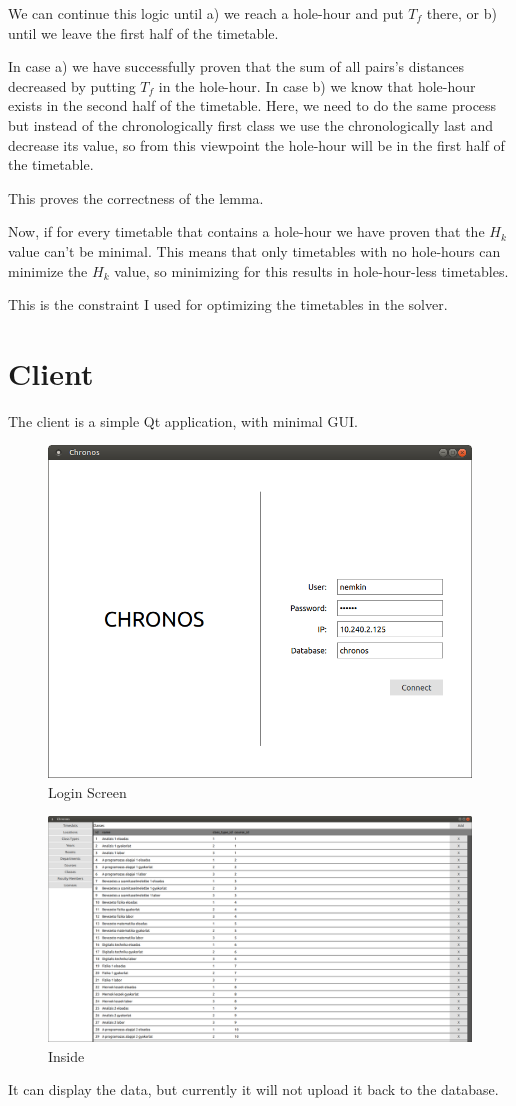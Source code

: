 We can continue this logic until a) we reach a hole-hour and put $T_f$ there, or b) until we leave the first half of the timetable.

In case a) we have successfully proven that the sum of all pairs's distances decreased by putting $T_f$ in the hole-hour. In case b) we know that hole-hour exists in the second half of the timetable. Here, we need to do the same process but instead of the chronologically first class we use the chronologically last and decrease its value, so from this viewpoint the hole-hour will be in the first half of the timetable.

This proves the correctness of the lemma.

Now, if for every timetable that contains a hole-hour we have proven that the $H_k$ value can't be minimal. This means that only timetables with no hole-hours can minimize the $H_k$ value, so minimizing for this results in hole-hour-less timetables.

This is the constraint I used for optimizing the timetables in the solver.

\section{Client}

The client is a simple Qt application, with minimal GUI.

\begin{figure}[!ht]
\centering
\includegraphics[width=\linewidth, keepaspectratio]{figures/login.png}
\caption{Login Screen} 
\end{figure}

\begin{figure}[!ht]
\centering
\includegraphics[width=\linewidth, keepaspectratio]{figures/inside.png}
\caption{Inside} 
\end{figure}

It can display the data, but currently it will not upload it back to the database.
